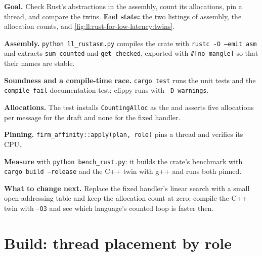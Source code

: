 \begin{tutorial}
\textbf{Goal.} Check Rust's abstractions in the assembly, count its allocations, pin a thread, and compare the twins.
\textbf{End state:} the two listings of assembly, the allocation counts, and \cref{fig:ll:rust-for-low-latency:twins}.
\begin{tutsteps}
\item \textbf{Assembly.} \texttt{python ll\_rustasm.py} compiles the crate with \texttt{rustc -O --emit asm} and extracts
\texttt{sum\_counted} and \texttt{get\_checked}, exported with \texttt{\#[no\_mangle]} so that their names are stable.
\item \textbf{Soundness and a compile-time race.} \texttt{cargo test} runs the unit tests and the \texttt{compile\_fail}
documentation test; clippy runs with \texttt{-D warnings}.
\item \textbf{Allocations.} The test installs \texttt{CountingAlloc} as the  and asserts five allocations
per message for the draft and none for the fixed handler.
\item \textbf{Pinning.} \texttt{firm\_affinity::apply(plan, role)} pins a thread and verifies its CPU.
\item \textbf{Measure} with \texttt{python bench\_rust.py}: it builds the crate's benchmark with \texttt{cargo build
--release} and the C++ twin with g++ and runs both pinned.
\end{tutsteps}
\textbf{What to change next.} Replace the fixed handler's linear search with a small open-addressing table and keep the
allocation count at zero; compile the C++ twin with \texttt{-O3} and see which language's counted loop is faster then.
\end{tutorial}

\section{Build: thread placement by role}\label{bld:ll:rust-for-low-latency:affinity}

